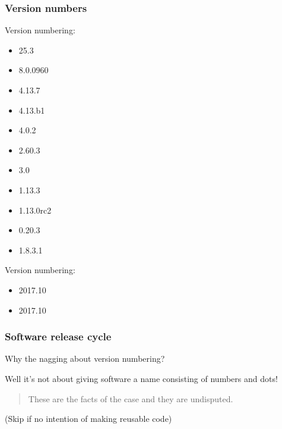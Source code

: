 \documentclass{beamer}
\newcommand{\megaskip}{\bigskip\bigskip\bigskip\bigskip}
\begin{document}
\begin{frame}
  \frametitle{Version numbers}


Version numbering:

  \pause

\begin{itemize}
\item 25.3
\item 8.0.0960
\item 4.13.7
\item 4.13.b1
\item 4.0.2
\item 2.60.3
\item 3.0
\item 1.13.3
\item 1.13.0rc2
\item 0.20.3
\item 1.8.3.1
\end{itemize}

\pause

Version numbering:
\begin{itemize}
\item 2017.10
\item 2017.10
\end{itemize}
\end{frame}


\begin{frame}
  \frametitle{Software release cycle}

  Why the nagging about version numbering?

  \bigskip

  Well it's not about giving software a name consisting of numbers and dots!

  \megaskip

  \begin{quote}
    These are the facts of the case and they are undisputed.
  \end{quote}

  \megaskip

  (Skip if no intention of making reusable code)
\end{frame}
\end{document}
